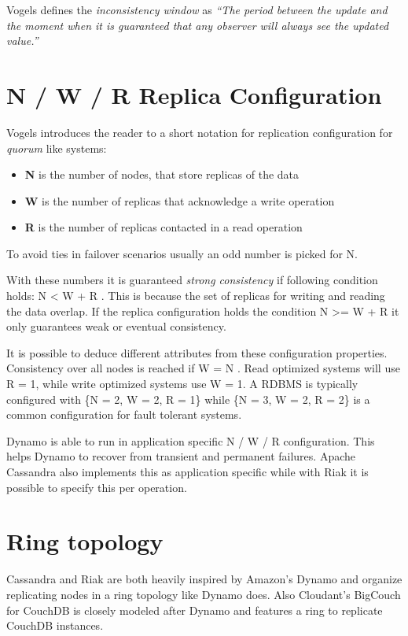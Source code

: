 Vogels defines the \emph{inconsistency window} as
\emph{``The period between the update and the moment when it is guaranteed that any observer will always see the updated value.''}

\section{N / W / R Replica Configuration}

Vogels introduces the reader to a short notation for replication
configuration for \emph{quorum} like systems:

\begin{itemize}
\item
  \textbf{N} is the number of nodes, that store replicas of the data
\item
  \textbf{W} is the number of replicas that acknowledge a write
  operation
\item
  \textbf{R} is the number of replicas contacted in a read operation
\end{itemize}
To avoid ties in failover scenarios usually an odd number is picked
for N.

With these numbers it is guaranteed \emph{strong consistency} if
following condition holds: N \textless{} W + R . This is because the
set of replicas for writing and reading the data overlap. If the
replica configuration holds the condition  N \textgreater{}= W + R
it only guarantees weak or eventual consistency.

It is possible to deduce different attributes from these
configuration properties. Consistency over all nodes is reached if
W = N . Read optimized systems will use R = 1, while write optimized
systems use W = 1. A RDBMS is typically configured with \{N = 2, W = 2, R = 1\} 
\newline while \{N = 3, W = 2, R = 2\} is a common configuration for fault
tolerant systems.

Dynamo is able to run in application specific N / W / R
configuration. This helps Dynamo to recover from transient and
permanent failures. Apache Cassandra also implements this as application
specific while with Riak it is possible to specify this per operation.

\section{Ring topology}

Cassandra and Riak are both heavily inspired by Amazon's Dynamo and organize
replicating nodes in a ring topology like Dynamo does. Also Cloudant's BigCouch
\cite{bigcouch} for CouchDB is closely modeled after Dynamo
and features a ring to replicate CouchDB instances.

